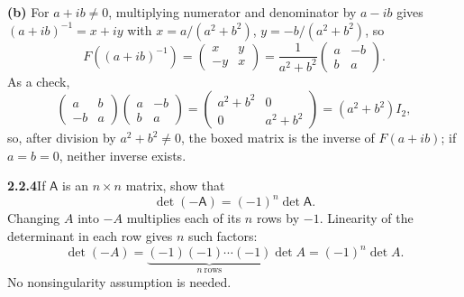 \textbf{(b)} For $a+ib\ne0$, multiplying numerator and denominator by
$a-ib$ gives $(a+ib)^{-1}=x+iy$ with $x=a/(a^2+b^2)$,
$y=-b/(a^2+b^2)$, so
\[
\boxed{F((a+ib)^{-1})=\begin{pmatrix}x&y\\-y&x\end{pmatrix}
=\frac1{a^2+b^2}
\begin{pmatrix}a&-b\\b&a\end{pmatrix}}.
\]
As a check,
\[
\begin{pmatrix}a&b\\-b&a\end{pmatrix}
\begin{pmatrix}a&-b\\b&a\end{pmatrix}
=\begin{pmatrix}a^2+b^2&0\\0&a^2+b^2\end{pmatrix}
=(a^2+b^2)I_2,
\]
so, after division by $a^2+b^2\ne0$, the boxed matrix is the inverse
of $F(a+ib)$; if $a=b=0$, neither inverse exists.

\par\bigskip
\noindent\textbf{2.2.4}\quad If $\mathsf{A}$ is an $n\times n$ matrix, show
that
\[
\det(-\mathsf{A})=(-1)^{n}\det\mathsf{A}.
\]
\solution
Changing $A$ into $-A$ multiplies each of its $n$ rows by $-1$.
Linearity of the determinant in each row gives $n$ such factors:
\[
\det(-A)=\underbrace{(-1)(-1)\cdots(-1)}_{n\ \text{rows}}\det A
=\boxed{(-1)^n\det A}.
\]
No nonsingularity assumption is needed.

